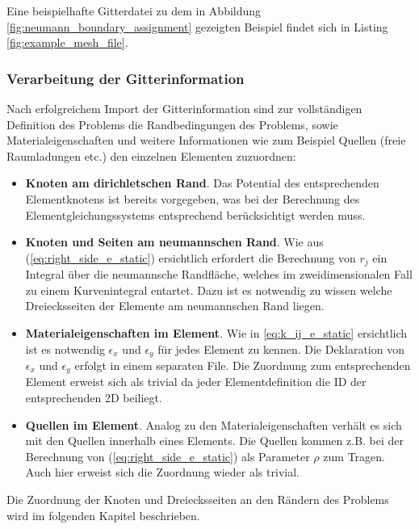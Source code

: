 Eine beispielhafte Gitterdatei zu dem in Abbildung \ref{fig:neumann_boundary_assignment} gezeigten Beispiel findet sich in Listing \ref{fig:example_mesh_file}.


\subsubsection{Verarbeitung der Gitterinformation}
Nach erfolgreichem Import der Gitterinformation sind zur vollständigen Definition des Problems die Randbedingungen des Problems, sowie Materialeigenschaften und weitere Informationen wie zum Beispiel Quellen (freie Raumladungen etc.) den einzelnen Elementen zuzuordnen: \newline

\begin{itemize}
	\item \textbf{Knoten am dirichletschen Rand}. Das Potential des entsprechenden Elementknotens ist bereits vorgegeben, was bei der Berechnung des Elementgleichungssystems entsprechend berücksichtigt werden muss.
	\item \textbf{Knoten und Seiten am neumannschen Rand}. Wie aus (\ref{eq:right_side_e_static}) ersichtlich erfordert die Berechnung von $r_j$ ein Integral über die neumannsche Randfläche, welches im zweidimensionalen Fall zu einem Kurvenintegral entartet. Dazu ist es notwendig zu wissen welche Dreiecksseiten der Elemente am neumannschen Rand liegen.
	\item \textbf{Materialeigenschaften im Element}. Wie in \ref{eq:k_ij_e_static} ersichtlich ist es notwendig $\epsilon_x$ und $\epsilon_y$ für jedes Element zu kennen. Die Deklaration von $\epsilon_x$ und $\epsilon_y$ erfolgt in einem separaten File. Die Zuordnung zum entsprechenden Element erweist sich als trivial da jeder Elementdefinition die ID der entsprechenden 2D  beiliegt.
	\item \textbf{Quellen im Element}. Analog zu den Materialeigenschaften verhält es sich mit den Quellen innerhalb eines Elements. Die Quellen kommen z.B. bei der Berechnung von (\ref{eq:right_side_e_static}) als Parameter $\rho$ zum Tragen. Auch hier erweist sich die Zuordnung wieder als trivial.
\end{itemize}

Die Zuordnung der Knoten und Dreiecksseiten an den Rändern des Problems wird im folgenden Kapitel beschrieben.

